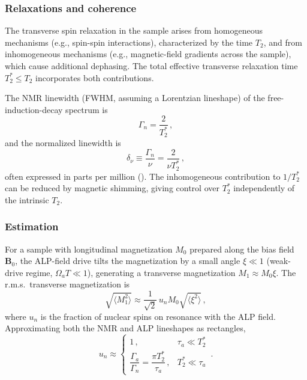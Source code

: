 \subsubsection{Relaxations and coherence}\label{sec:theory:relaxations}
The transverse spin relaxation in the sample arises from homogeneous mechanisms (e.g., spin-spin interactions), characterized by the time $T_2$, and from inhomogeneous mechanisms (e.g., magnetic-field gradients across the sample), which cause additional dephasing. The total effective transverse relaxation time $T_2^* \leq T_2$ incorporates both contributions. 

The NMR linewidth (FWHM, assuming a Lorentzian lineshape) of the free-induction-decay spectrum is
\begin{equation}
    \Gamma_{n} = \dfrac{2}{T_2^*}
    \,,\label{eq:Gamma_n}
\end{equation}
and the normalized linewidth is
\begin{equation}
    \delta_\nu \equiv \dfrac{\Gamma_{n}}{\nu} = \dfrac{2}{\nu T_2^*}
    \,,\label{eq:delta_nu}
\end{equation}
often expressed in parts per million (\SI{}{\ppm}). The inhomogeneous contribution to $1/T_2^*$ can be reduced by magnetic shimming, giving control over $T_2^*$ independently of the intrinsic $T_2$.


\subsubsection{Estimation}\label{sec:theory:estimation}

For a sample with longitudinal magnetization $M_0$ prepared along the bias field $\mathbf{B}_0$, the ALP-field drive tilts the magnetization by a small angle $\xi \ll 1$ (weak-drive regime, $\Omega_a T \ll 1$), generating a transverse magnetization $M_1 \approx M_0\xi$. The r.m.s.\ transverse magnetization is \cite{Yuzhe2023_FrequencyScanning}
\begin{equation}
    \sqrt{\langle M_{1}^2 \rangle} \approx \dfrac{1}{\sqrt{2}}\, u_n M_{0} \sqrt{\langle \xi^2 \rangle}
    \,,\label{eq:M1_rms}
\end{equation}
where $u_n$ is the fraction of nuclear spins on resonance with the ALP field. Approximating both the NMR and ALP lineshapes as rectangles,
\begin{equation}
    u_n \approx \left\{
    \begin{array}{cl}
    1\,,
    &  \tau_a \ll T_2^* \\[6pt]
    \dfrac{\Gamma_a}{\Gamma_{n}} = \dfrac{\pi T_2^*}{\tau_a}\,,
    &  T_2^* \ll \tau_a
    \end{array} \right.
    \,.\label{eq:un}
\end{equation}

